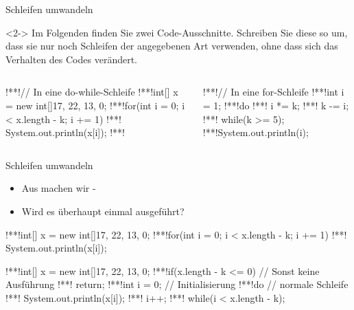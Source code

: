 \begin{frame}[fragile,c]{Schleifen umwandeln}
\begin{uncoverenv}<2->
\flushleft Im Folgenden finden Sie zwei Code-Ausschnitte. Schreiben Sie diese so um, dass sie nur noch Schleifen der angegebenen Art verwenden, ohne dass sich das Verhalten des Codes verändert. 
\begin{columns}[onlytextwidth,T]
\begin{plainjava}
!**!// In eine do-while-Schleife
!**!int[] x = new int[]{17, 22, 13, 0};
!**!for(int i = 0; i < x.length - k; i += 1) {
!**!    System.out.println(x[i]);
!**!}
\end{plainjava}
\begin{plainjava}
!**!// In eine for-Schleife
!**!int i = 1;
!**!do {
!**!    i *= k;
!**!    k -= i;
!**!} while(k >= 5);
!**!System.out.println(i);
\end{plainjava}
\end{columns}
\end{uncoverenv}
%
\end{frame}
\SidebarReset

\SidebarSolution
\begin{frame}[fragile,c]{Schleifen umwandeln}
\begin{itemize}[<+(1)->]
   \itemsep3pt
   \item Aus  machen wir -
   \item Wird es überhaupt einmal ausgeführt?
\end{itemize}
\begin{plainjava}
!**!int[] x = new int[]{17, 22, 13, 0};
!**!for(int i = 0; i < x.length - k; i += 1)
!**!    System.out.println(x[i]);
\end{plainjava}
\vspace*{-1.4\baselineskip}\par\null\qquad{\color{lightgray}\faCaretDown}
\begin{plainjava}
!**!int[] x = new int[]{17, 22, 13, 0};
!**!if(x.length - k <= 0) // Sonst keine Ausführung
!**!   return;
!**!int i = 0; // Initialisierung
!**!do { // normale Schleife
!**!   System.out.println(x[i]);
!**!   i++;
!**!} while(i < x.length - k);
\end{plainjava}
\end{frame}

